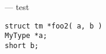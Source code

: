 \startmanpage
{}
--- test  
\startvb\begin{verbatim}
struct tm *foo2( a, b )
MyType *a;
short b;
\end{verbatim}
\endvb

\endmanpage
